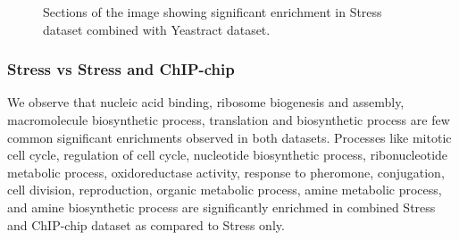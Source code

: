 \begin{figure}[p]
\centering
{}
\label{fig:maxent_stress_yt_enrich}
\caption{Sections of the image showing significant enrichment in Stress dataset combined with Yeastract dataset.}
\end{figure}

\subsubsection{Stress vs Stress and ChIP-chip}
We observe that nucleic acid binding, ribosome biogenesis and assembly, macromolecule biosynthetic process, translation and biosynthetic process are 
few common significant enrichments observed in both datasets. Processes like mitotic cell cycle, regulation of cell cycle, nucleotide biosynthetic process, 
ribonucleotide metabolic process, oxidoreductase activity, response to pheromone, conjugation, cell division, reproduction, organic metabolic process, 
amine metabolic process, and amine biosynthetic process are significantly enrichmed in combined Stress and ChIP-chip dataset as compared to Stress only.

